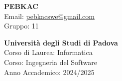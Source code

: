 \begin{minipage}[]{0.3\textwidth}
 
\end{minipage}
\hspace{0.1\textwidth}
\begin{minipage}[]{0.6\textwidth}
  {\Large \textbf{PEBKAC}} \\
  Email: \href{mailto:pebkacswe@gmail.com}{pebkacswe@gmail.com} \\
  Gruppo: 11
\end{minipage}

\bigskip

\begin{minipage}[]{0.3\textwidth}
 
\end{minipage}
\hspace{0.1\textwidth}
\begin{minipage}[]{0.6\textwidth}
  \textcolor{unipd}{
    \textbf{Università degli Studi di Padova} \\
    Corso di Laurea: Informatica \\
    Corso: Ingegneria del Software \\
    Anno Accademico: 2024/2025
  }
\end{minipage}


\bigskip
\bigskip
\bigskip